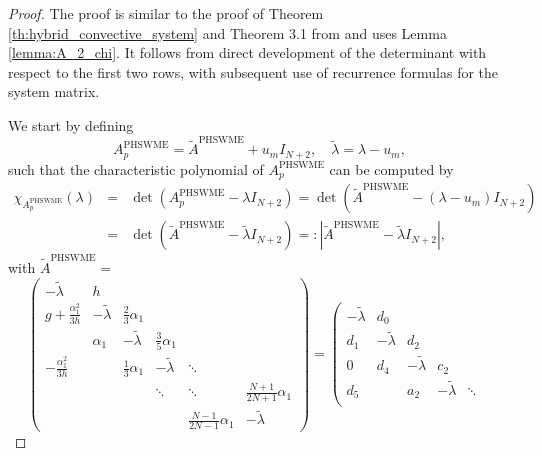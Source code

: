 \documentclass[a4paper, 11pt]{article}
\begin{document}
\begin{proof}
    The proof is similar to the proof of Theorem \ref{th:hybrid_convective_system} and Theorem 3.1 from \cite{Koellermeier2020c} and uses Lemma \ref{lemma:A_2_chi}. It follows from direct development of the determinant with respect to the first two rows, with subsequent use of recurrence formulas for the system matrix.

    We start by defining
    \begin{equation}
       A^{\textrm{PHSWME}}_{p} = \widetilde{A}^{{\textrm{PHSWME}}} + u_m I_{N+2}, \quad \widetilde{\lambda} = \lambda - u_m,
    \end{equation}
    such that the characteristic polynomial of $A^{\textrm{PHSWME}}_{p}$ can be computed by
    \begin{eqnarray}
       \chi_{A^{\textrm{PHSWME}}_{p}}(\lambda) &=& \det\left( A^{\textrm{PHSWME}}_{p} - \lambda I_{N+2} \right) = \det\left( \widetilde{A}^{{\textrm{PHSWME}}} - \left(\lambda - u_m \right) I_{N+2} \right) \\
       &=& \det\left( \widetilde{A}^{{\textrm{PHSWME}}} - \widetilde{\lambda} I_{N+2} \right) =: \left| \widetilde{A}^{{\textrm{PHSWME}}} - \widetilde{\lambda} I_{N+2} \right|,
    \end{eqnarray}
    with $\widetilde{A}^{{\textrm{PHSWME}}} =$
    \begin{equation}
        \left(\begin{array}{cccccc}
        - \widetilde{\lambda} & h &  &  &  &  \\
        g + \frac{\alpha_1^2}{3 h} & - \widetilde{\lambda} & \frac{2}{3} \alpha_1 &  &  &  \\
         & \alpha_1 & - \widetilde{\lambda} & \frac{3}{5} \alpha_1 & &\\
        -\frac{\alpha_1^2}{3h} &   & \frac{1}{3}\alpha_1 & - \widetilde{\lambda} & \ddots & \\
         &  &  & \ddots & \ddots & \frac{N+1}{2N+1}\alpha_1 \\
         &  &  &  & \frac{N-1}{2N-1}\alpha_1 & - \widetilde{\lambda}
        \end{array}\right) =
        \left(\begin{array}{cccccc}
        - \widetilde{\lambda} & d_0 &  &  &  &  \\
        d_1 & - \widetilde{\lambda} & d_2 &  &  &  \\
        0 & d_4 & - \widetilde{\lambda} & c_2 & &\\
        d_5 &   & a_2 & - \widetilde{\lambda} & \ddots & \\

\end{array}
\end{equation}
\end{proof}
\end{document}

